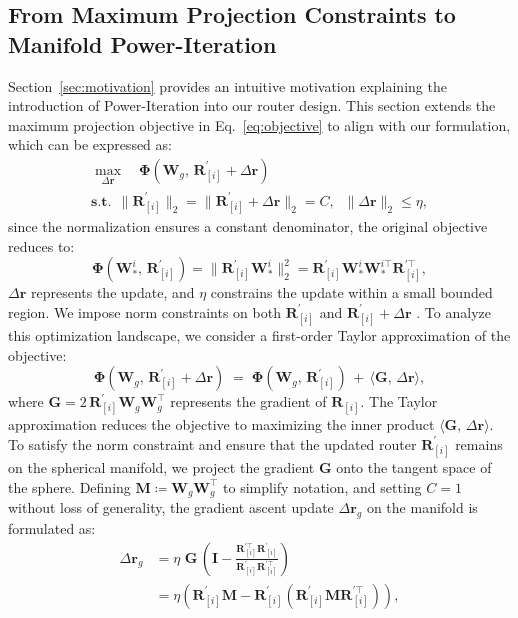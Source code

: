 \documentclass{llmxive}
\providecommand{\bm}[1]{\boldsymbol{#1}}
\providecommand{\vr}{{\bm{r}}}
\providecommand{\mG}{{\bm{G}}}
\providecommand{\mI}{{\bm{I}}}
\providecommand{\mM}{{\bm{M}}}
\providecommand{\mR}{{\bm{R}}}
\providecommand{\mW}{{\bm{W}}}
\begin{document}
\subsection{From Maximum Projection Constraints to Manifold Power-Iteration}
\label{sec:update}
Section~\ref{sec:motivation} provides an intuitive motivation explaining the introduction of Power-Iteration into our router design.
This section extends the maximum projection objective in Eq.~\ref{eq:objective} to align with our formulation, which can be expressed as:
\begin{gather}
    \max_{\Delta \vr} \quad \bm{\Phi}(\mW_g, \, \mR_{[i]}^\prime + \Delta \vr) \\
    \mathrm{\textbf{s.t.}} \,\; \|\mR_{[i]}^\prime\|_2 = \|\mR_{[i]}^\prime + \Delta \vr\|_2 = C, \;\; \|\Delta \vr\|_2 \le \eta, \nonumber
\end{gather}
since the normalization ensures a constant denominator, the original objective reduces to:
\[
    \bm{\Phi}(\mW_{*}^i, \, \mR_{[i]}^\prime) = \|\mR_{[i]}^\prime\mW_*^i\|_2^2 = \mR_{[i]}^\prime\mW_*^i\mW_*^{i\top}\mR_{[i]}^{\prime\top},
\]
$\Delta \vr$ represents the update, and $\eta$ constrains the update within a small bounded region. 
We impose norm constraints on both $\mR_{[i]}^\prime$ and $\mR_{[i]}^\prime + \Delta \vr$ .
To analyze this optimization landscape, we consider a first-order Taylor approximation of the objective:
\begin{equation*}
    \bm{\Phi}(\mW_g, \, \mR_{[i]}^\prime + \Delta \vr) \; = \; \bm{\Phi}(\mW_g, \, \mR_{[i]}^\prime)  \, + \, \langle \mG, \, \Delta \vr \rangle,
\end{equation*}
where $\mG = 2 \, \mR_{[i]}^\prime \mW_g \mW_g^\top$ represents the gradient of $\mR_{[i]}$.
The Taylor approximation reduces the objective to maximizing the inner product $\langle \mG, \, \Delta \vr \rangle$.
To satisfy the norm constraint and ensure that the updated router $\mR_{[i]}^\prime$ remains on the spherical manifold, we project the gradient $\mG$ onto the tangent space of the sphere. 
Defining $\mM \coloneqq \mW_g\mW_g^\top$ to simplify notation, and setting $C = 1$ without loss of generality, the gradient ascent update $\Delta \vr_{g}$ on the manifold is formulated as:
\begin{align}
    \Delta \vr_{g} &= \eta \,\, \mG \, \left( \mI - \frac{\mR_{[i]}^{\prime\top}\mR_{[i]}^\prime}{\mR_{[i]}^\prime\mR_{[i]}^{\prime\top}}  \right) \nonumber \\
        &= \eta \left( \mR_{[i]}^\prime\mM - \mR_{[i]}^\prime \left(\mR_{[i]}^\prime \mM\mR_{[i]}^{\prime\top}\right) \right), 
\end{align}
\end{document}
